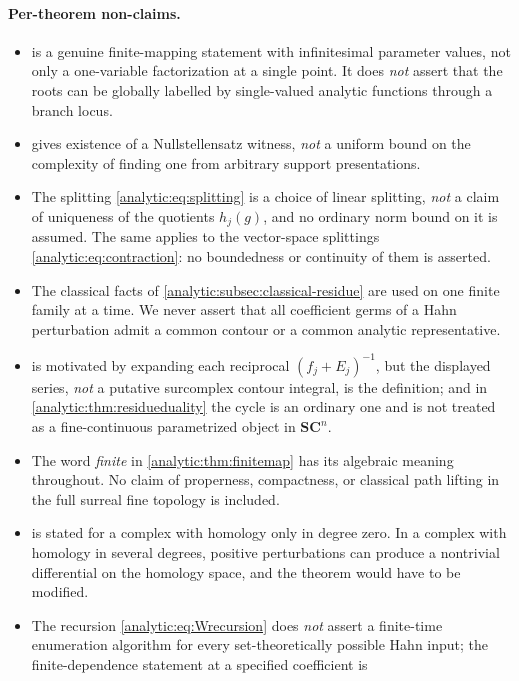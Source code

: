 \documentclass[11pt,letterpaper]{article}
\theoremstyle{definition}
\theoremstyle{remark}
\newcommand{\SC}{\mathbf{SC}}
\numberwithin{equation}{section}
\begin{document}
\paragraph{Per-theorem non-claims.}
\begin{itemize}
\item {} is a genuine finite-mapping
statement with infinitesimal parameter values, not only a one-variable
factorization at a single point. It does \emph{not} assert that the roots
can be globally labelled by single-valued analytic functions through a
branch locus.
\item {} gives existence of a Nullstellensatz
witness, \emph{not} a uniform bound on the complexity of finding one from
arbitrary support presentations.
\item The splitting \eqref{analytic:eq:splitting} is a choice of linear
splitting, \emph{not} a claim of uniqueness of the quotients $h_j(g)$, and
no ordinary norm bound on it is assumed. The same applies to the
vector-space splittings \eqref{analytic:eq:contraction}: no boundedness or
continuity of them is asserted.
\item The classical facts of
\cref{analytic:subsec:classical-residue} are used on one finite family at a
time. We never assert that all coefficient germs of a Hahn perturbation
admit a common contour or a common analytic representative.
\item {} is motivated by expanding each
reciprocal $(f_j+E_j)^{-1}$, but the displayed series, \emph{not} a putative
surcomplex contour integral, is the definition; and in
\cref{analytic:thm:residueduality} the cycle is an ordinary one and is not
treated as a fine-continuous parametrized object in $\SC^n$.
\item The word \emph{finite} in
\cref{analytic:thm:finitemap} has its algebraic meaning throughout. No
claim of properness, compactness, or classical path lifting in the full
surreal fine topology is included.
\item {} is stated for a complex with homology
only in degree zero. In a complex with homology in several degrees,
positive perturbations can produce a nontrivial differential on the homology
space, and the theorem would have to be modified.
\item The recursion \eqref{analytic:eq:Wrecursion} does \emph{not} assert a
finite-time enumeration algorithm for every set-theoretically possible Hahn
input; the finite-dependence statement at a specified coefficient is

\end{itemize}
\end{document}

